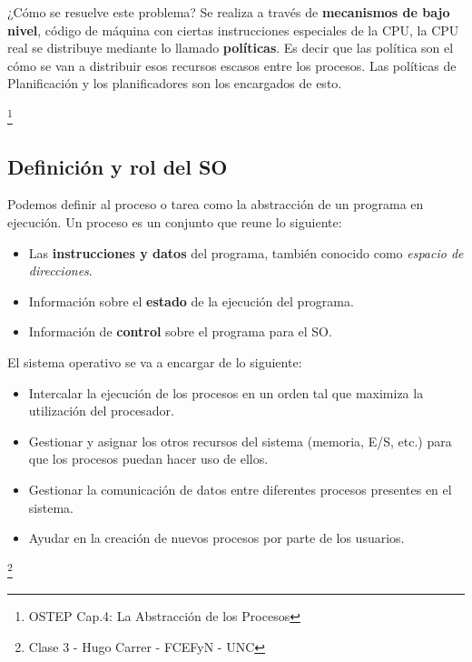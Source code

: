 \documentclass{article}
\begin{document}
¿Cómo se resuelve este problema? Se realiza a través de \textbf{mecanismos de bajo nivel}, código de máquina con ciertas instrucciones especiales de la CPU, la CPU real se distribuye mediante lo llamado \textbf{políticas}. Es decir que las política son el cómo se van a distribuir esos recursos escasos entre los procesos. Las políticas de Planificación y los planificadores son los encargados de esto.

\footnote{OSTEP Cap.4: La Abstracción de los Procesos}

\subsection{Definición y rol del SO}
Podemos definir al proceso o tarea como la abstracción de un programa en ejecución. Un proceso es un conjunto que reune lo siguiente:
\begin{itemize}
    \item Las \textbf{instrucciones y datos} del programa, también conocido como \textit{espacio de direcciones}.
    \item Información sobre el \textbf{estado} de la ejecución del programa.
    \item Información de \textbf{control} sobre el programa para el SO.
\end{itemize}
El sistema operativo se va a encargar de lo siguiente:
\begin{itemize}
    \item Intercalar la ejecución de los procesos en un orden tal que maximiza la utilización del procesador.
    \item Gestionar y asignar los otros recursos del sistema (memoria, E/S, etc.) para que los procesos puedan hacer uso de ellos.
    \item Gestionar la comunicación de datos entre diferentes procesos presentes en el sistema.
    \item Ayudar en la creación de nuevos procesos por parte de los usuarios.
\end{itemize}

\footnote{Clase 3 - Hugo Carrer - FCEFyN - UNC}
\end{document}
